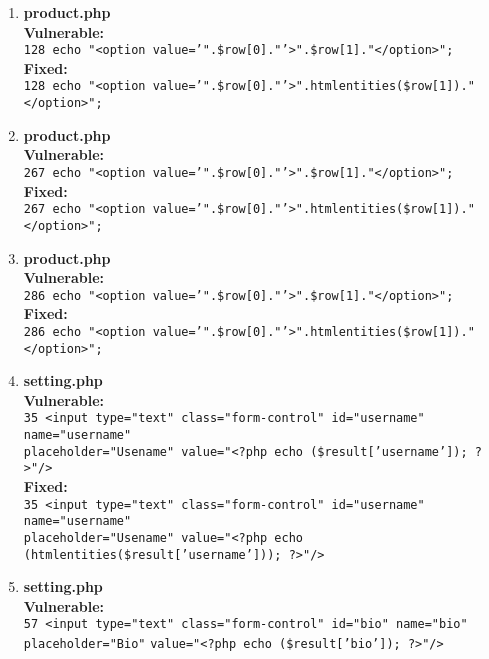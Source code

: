 \documentclass[11pt]{article}
\begin{document}
\begin{enumerate}
	\item \textbf{product.php} \\
	\textbf{Vulnerable:} \\ 
		\texttt{128 echo "<option value='".\$row[0]."'>".\$row[1]."</option>";} \\
	\textbf{Fixed:} \\
		\texttt{128 echo "<option value='".\$row[0]."'>".htmlentities(\$row[1])."</option>";} \\

	\item \textbf{product.php} \\
	\textbf{Vulnerable:} \\ 
		\texttt{267 echo "<option value='".\$row[0]."'>".\$row[1]."</option>";}\\
	\textbf{Fixed:} \\
		\texttt{267 echo "<option value='".\$row[0]."'>".htmlentities(\$row[1])."</option>";} \\

	\item \textbf{product.php} \\
	\textbf{Vulnerable:} \\ 
		\texttt{286 echo "<option value='".\$row[0]."'>".\$row[1]."</option>";} \\
	\textbf{Fixed:} \\
		\texttt{286 echo "<option value='".\$row[0]."'>".htmlentities(\$row[1])."</option>";} \\
	
	\item \textbf{setting.php} \\
	\textbf{Vulnerable:} \\ 
		\texttt{35 <input type="text" class="form-control" id="username" name="username"}\\ 
		\texttt{placeholder="Usename" value="<?php echo (\$result['username']); ?>"/>} \\
		
	\textbf{Fixed:} \\
		\texttt{35 <input type="text" class="form-control" id="username" name="username"}\\ 
		\texttt{placeholder="Usename" value="<?php echo (htmlentities(\$result['username'])); ?>"/>} \\

	\newpage
	\item \textbf{setting.php} \\
	\textbf{Vulnerable:} \\ 
		\texttt{57 <input type="text" class="form-control" id="bio" name="bio" placeholder="Bio"} 
		\texttt{value="<?php echo (\$result['bio']); ?>"/>} \\
		

\end{enumerate}
\end{document}
